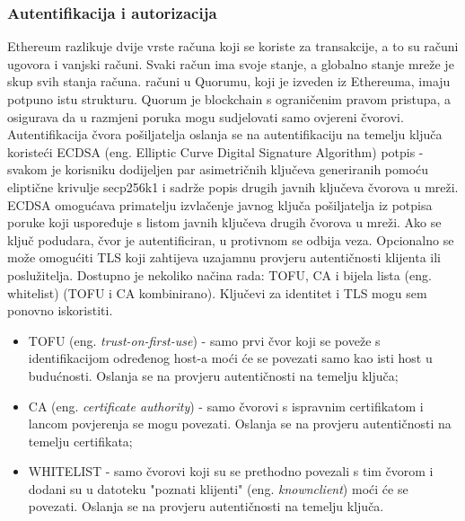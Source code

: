 \documentclass[times, utf8, diplomski]{fer}
\begin{document}
\subsubsection{Autentifikacija i autorizacija}
Ethereum razlikuje dvije vrste računa koji se koriste za transakcije, a to su računi ugovora i vanjski računi. Svaki račun ima svoje stanje, a globalno stanje mreže je skup svih stanja računa. računi u Quorumu, koji je izveden iz Ethereuma, imaju potpuno istu strukturu. Quorum je blockchain s ograničenim pravom pristupa, a osigurava da u razmjeni poruka mogu sudjelovati samo ovjereni čvorovi. Autentifikacija čvora pošiljatelja oslanja se na autentifikaciju na temelju ključa koristeći ECDSA (eng. Elliptic Curve Digital Signature Algorithm) potpis - svakom je korisniku dodijeljen par asimetričnih ključeva generiranih pomoću eliptične krivulje secp256k1 i sadrže popis drugih javnih ključeva čvorova u mreži.  \cite{johnson2001elliptic} ECDSA omogućava primatelju izvlačenje javnog ključa pošiljatelja iz potpisa poruke koji uspoređuje s listom javnih ključeva drugih čvorova u mreži. Ako se ključ podudara, čvor je autentificiran, u protivnom se odbija veza. Opcionalno se može omogućiti TLS koji zahtijeva uzajamnu provjeru autentičnosti klijenta ili poslužitelja. Dostupno je nekoliko načina rada: TOFU, CA i bijela lista (eng. whitelist) (TOFU i CA kombinirano). Ključevi za identitet i TLS mogu sem ponovno iskoristiti. \cite{lagarde2019security}

\begin{itemize}

\item TOFU (eng.  \textit{trust-on-first-use}) - samo prvi čvor koji se poveže s identifikacijom određenog host-a moći će se povezati samo kao isti host u budućnosti. Oslanja se na provjeru autentičnosti na temelju ključa;

\item CA (eng.  \textit{certificate authority}) - samo čvorovi s ispravnim certifikatom i lancom povjerenja se mogu povezati. Oslanja se na provjeru autentičnosti na temelju certifikata;

\item WHITELIST - samo čvorovi koji su se prethodno povezali s tim čvorom i dodani su u datoteku "poznati klijenti" (eng.  \textit{knownclient}) moći će se povezati.  Oslanja se na provjeru autentičnosti na temelju ključa. \cite{valenta2017comparison}

\end{itemize}
\end{document}
